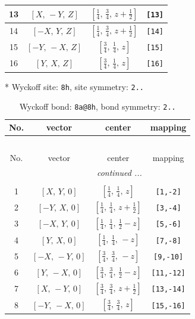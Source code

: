 \documentclass[fleqn,8pt]{jsarticle}
\begin{document}
\begin{longtable}{cccc}
13 & $\left[ X,\, - Y,\, Z \right]$ & $\left[ \frac{1}{4},\, \frac{3}{4},\, z + \frac{1}{2} \right]$ & {\tt [13]} \\ \hline
14 & $\left[ - X,\, Y,\, Z \right]$ & $\left[ \frac{1}{4},\, \frac{3}{4},\, z + \frac{1}{2} \right]$ & {\tt [14]} \\ \hline
15 & $\left[ - Y,\, - X,\, Z \right]$ & $\left[ \frac{3}{4},\, \frac{1}{4},\, z \right]$ & {\tt [15]} \\ \hline
16 & $\left[ Y,\, X,\, Z \right]$ & $\left[ \frac{3}{4},\, \frac{1}{4},\, z \right]$ & {\tt [16]} \\
\end{longtable}
* Wyckoff site: {\tt 8h}, site symmetry: {\tt 2..}
\renewcommand{\arraystretch}{1.2}
\begin{longtable}{cccc}
\caption{Wyckoff bond: {\tt 8a@8h}, bond symmetry: {\tt 2..}}
 \\
 \hline \hline
No. & vector & center & mapping \\ \hline \endfirsthead

\multicolumn{3}{l}{\tablename\ \thetable{}} \\
 \hline \hline
No. & vector & center & mapping \\ \hline \endhead

 \hline \hline
\multicolumn{3}{r}{\footnotesize\it continued ...} \\ \endfoot

 \hline \hline
\multicolumn{3}{r}{} \\ \endlastfoot

1 & $\left[ X,\, Y,\, 0 \right]$ & $\left[ \frac{1}{4},\, \frac{1}{4},\, z \right]$ & {\tt [1,-2]} \\ \hline
2 & $\left[ - Y,\, X,\, 0 \right]$ & $\left[ \frac{1}{4},\, \frac{1}{4},\, z + \frac{1}{2} \right]$ & {\tt [3,-4]} \\ \hline
3 & $\left[ - X,\, Y,\, 0 \right]$ & $\left[ \frac{1}{4},\, \frac{1}{4},\, \frac{1}{2} - z \right]$ & {\tt [5,-6]} \\ \hline
4 & $\left[ Y,\, X,\, 0 \right]$ & $\left[ \frac{1}{4},\, \frac{1}{4},\, - z \right]$ & {\tt [7,-8]} \\ \hline
5 & $\left[ - X,\, - Y,\, 0 \right]$ & $\left[ \frac{3}{4},\, \frac{3}{4},\, - z \right]$ & {\tt [9,-10]} \\ \hline
6 & $\left[ Y,\, - X,\, 0 \right]$ & $\left[ \frac{3}{4},\, \frac{3}{4},\, \frac{1}{2} - z \right]$ & {\tt [11,-12]} \\ \hline
7 & $\left[ X,\, - Y,\, 0 \right]$ & $\left[ \frac{3}{4},\, \frac{3}{4},\, z + \frac{1}{2} \right]$ & {\tt [13,-14]} \\ \hline
8 & $\left[ - Y,\, - X,\, 0 \right]$ & $\left[ \frac{3}{4},\, \frac{3}{4},\, z \right]$ & {\tt [15,-16]} \\
\end{longtable}
\end{document}

